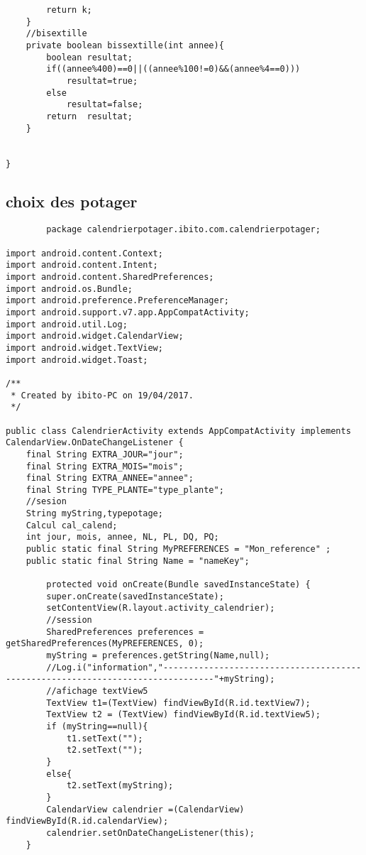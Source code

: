 \begin{lstlisting}
        return k;
    }
    //bisextille
    private boolean bissextille(int annee){
        boolean resultat;
        if((annee%400)==0||((annee%100!=0)&&(annee%4==0)))
            resultat=true;
        else
            resultat=false;
        return  resultat;
    }


}

		\end{lstlisting}
	\subsection{choix des potager}
		\begin{lstlisting}
		package calendrierpotager.ibito.com.calendrierpotager;

import android.content.Context;
import android.content.Intent;
import android.content.SharedPreferences;
import android.os.Bundle;
import android.preference.PreferenceManager;
import android.support.v7.app.AppCompatActivity;
import android.util.Log;
import android.widget.CalendarView;
import android.widget.TextView;
import android.widget.Toast;

/**
 * Created by ibito-PC on 19/04/2017.
 */

public class CalendrierActivity extends AppCompatActivity implements CalendarView.OnDateChangeListener {
    final String EXTRA_JOUR="jour";
    final String EXTRA_MOIS="mois";
    final String EXTRA_ANNEE="annee";
    final String TYPE_PLANTE="type_plante";
    //sesion
    String myString,typepotage;
    Calcul cal_calend;
    int jour, mois, annee, NL, PL, DQ, PQ;
    public static final String MyPREFERENCES = "Mon_reference" ;
    public static final String Name = "nameKey";

        protected void onCreate(Bundle savedInstanceState) {
        super.onCreate(savedInstanceState);
        setContentView(R.layout.activity_calendrier);
        //session
        SharedPreferences preferences =  getSharedPreferences(MyPREFERENCES, 0);
        myString = preferences.getString(Name,null);
        //Log.i("information","--------------------------------------------------------------------------------"+myString);
        //afichage textView5
        TextView t1=(TextView) findViewById(R.id.textView7);
        TextView t2 = (TextView) findViewById(R.id.textView5);
        if (myString==null){
            t1.setText("");
            t2.setText("");
        }
        else{
            t2.setText(myString);
        }
        CalendarView calendrier =(CalendarView) findViewById(R.id.calendarView);
        calendrier.setOnDateChangeListener(this);
    }


\end{lstlisting}
